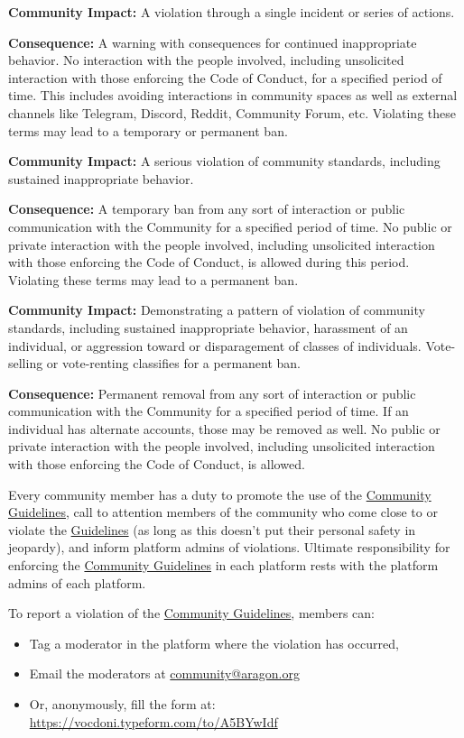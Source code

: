 \textbf{Community Impact:} A violation through a single incident or series of actions.

\textbf{Consequence:} A warning with consequences for continued inappropriate behavior. 
No interaction with the people involved, including unsolicited interaction with those enforcing the Code of Conduct, for a specified period of time. 
This includes avoiding interactions in community spaces as well as external channels like Telegram, Discord, Reddit, Community Forum, etc. 
Violating these terms may lead to a temporary or permanent ban.

\textbf{Community Impact:} A serious violation of community standards, including sustained inappropriate behavior.

\textbf{Consequence:} A temporary ban from any sort of interaction or public communication with the Community for a specified period of time. 
No public or private interaction with the people involved, including unsolicited interaction with those enforcing the Code of Conduct, is allowed during this period. 
Violating these terms may lead to a permanent ban.

\textbf{Community Impact:} Demonstrating a pattern of violation of community standards, including sustained inappropriate behavior, harassment of an individual, or aggression toward or disparagement of classes of individuals. Vote-selling or vote-renting classifies for a permanent ban.

\textbf{Consequence:} Permanent removal from any sort of interaction or public communication with the Community for a specified period of time. 
If an individual has alternate accounts, those may be removed as well. 
No public or private interaction with the people involved, including unsolicited interaction with those enforcing the Code of Conduct, is allowed.

Every community member has a duty to promote the use of the \hyperref[chap:CommunityGuidelines]{Community Guidelines}, call to attention members of the community who come close to or violate the \hyperref[chap:CommunityGuidelines]{Guidelines} (as long as this doesn’t put their personal safety in jeopardy), and inform platform admins of violations.
Ultimate responsibility for enforcing the \hyperref[chap:CommunityGuidelines]{Community Guidelines} in each platform rests with the platform admins of each platform.

To report a violation of the \hyperref[chap:CommunityGuidelines]{Community Guidelines}, members can:
\begin{itemize}
	\item Tag a moderator in the platform where the violation has occurred,
	\item Email the moderators at \href{community@aragon.org}{community@aragon.org}
	\item Or, anonymously, fill the form at: \href{https://vocdoni.typeform.com/to/A5BYwIdf}{https://vocdoni.typeform.com/to/A5BYwIdf}
\end{itemize}

